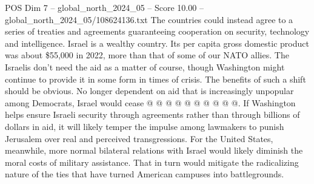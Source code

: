 \begin{textsample}{POS Dim 7 – global\_north\_2024\_05 – Score 10.00 – global\_north\_2024\_05/108624136.txt}
The countries could instead agree to a series of treaties and agreements guaranteeing cooperation on security, technology and intelligence.
Israel is a wealthy country.
Its per capita gross domestic product was about \$55,000 in 2022, more than that of some of our NATO allies.
The Israelis don't need the aid as a matter of course, though Washington might continue to provide it in some form in times of crisis.
The benefits of such a shift should be obvious.
No longer dependent on aid that is increasingly unpopular among Democrats, Israel would cease @ @ @ @ @ @ @ @ @ @.
If Washington helps ensure Israeli security through agreements rather than through billions of dollars in aid, it will likely temper the impulse among lawmakers to punish Jerusalem over real and perceived transgressions.
For the United States, meanwhile, more normal bilateral relations with Israel would likely diminish the moral costs of military assistance.
That in turn would mitigate the radicalizing nature of the ties that have turned American campuses into battlegrounds.

\end{textsample}
